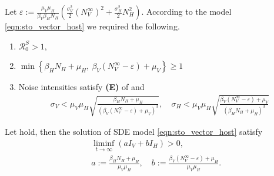 \begin{assumption} \label{ass:persistence}
    Let
    $
        \displaystyle
        \varepsilon:=
            \frac{\mu_V \mu_H}{\beta_V \beta_H N_H}
                \left(
                    \frac{\sigma_V ^ 2}{2}
                    \left(
                        N_V ^ {\infty}
                    \right) ^ 2
                    +
                    \frac{\sigma_H ^ 2}{2}
                    N_H ^2
                \right)
    $.
    According to the model \eqref{eqn:sto_vector_host} we required the
    following.
    \begin{enumerate}[\bf{(P\textendash}1)]
        \item
            $ \mathcal{R}_0 ^ S > 1$,
             
        \item
        $
            \displaystyle
            \min
            \left\{
                 \beta_H N_H + \mu_H, \ 
                 \beta_V (N_V ^ {\infty} - \varepsilon) + \mu_V
            \right\}
            \geq 1
        $
        \item Noise intensities satisfy 
            \textbf{(E)} of 
            and
            \begin{align*}
                \sigma_V 
                    < \mu_V \mu_H
                    \sqrt{
                        \frac{\beta_H N_H + \mu_H}{
                            \left(
                                \beta_V
                                \left(
                                    N_V ^ {\infty} - \varepsilon
                                \right) 
                                + \mu_V
                            \right)  ^ 3
                        }
                    },
                \quad
                \sigma_H 
                    < \mu_V \mu_H
                    \sqrt{
                        \frac{\beta_V (N_V ^ {\infty} - \varepsilon) + \mu_V}{
                            \left(
                                \beta_H N_H + \mu_H
                            \right)  ^ 3
                        }
                    }
            \end{align*}
    \end{enumerate}
    \end{assumption}
    \begin{theorem}
        Let  hold, then the solution of SDE model
        \eqref{eqn:sto_vector_host} satisfy
        \begin{align*}
            &\liminf_{t \to \infty}
                (a I_V + b I_H) > 0, \\
                & a:= \frac{\beta_H N_H + \mu_H}{\mu_V \mu_H},
                \quad
                b:=
                \frac{
                    \beta_V (N_V ^ {\infty} - \varepsilon)
                    + \mu_H
                    }{\mu_V \mu_H}.
        \end{align*}
    \end{theorem}